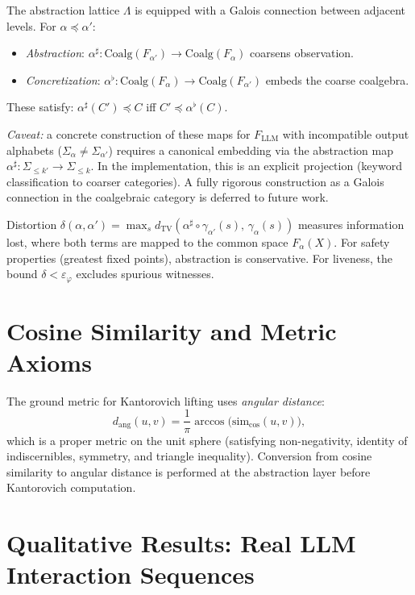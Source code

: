 \documentclass[11pt]{article}
\begin{document}
The abstraction lattice $\Lambda$ is equipped with a Galois connection
between adjacent levels.  For $\alpha \preceq \alpha'$:
\begin{itemize}[nosep,leftmargin=*]
\item \emph{Abstraction}: $\alpha^{\sharp}: \mathrm{Coalg}(F_{\alpha'}) \to
  \mathrm{Coalg}(F_{\alpha})$ coarsens observation.
\item \emph{Concretization}: $\alpha^{\flat}: \mathrm{Coalg}(F_{\alpha}) \to
  \mathrm{Coalg}(F_{\alpha'})$ embeds the coarse coalgebra.
\end{itemize}
These satisfy: $\alpha^{\sharp}(C') \preceq C$ iff
$C' \preceq \alpha^{\flat}(C)$.

\emph{Caveat:} a concrete construction of these maps for
$F_{\mathrm{LLM}}$ with incompatible output alphabets
($\Sigma_\alpha \neq \Sigma_{\alpha'}$) requires a canonical
embedding via the abstraction map $\alpha^\sharp: \Sigma_{\le k'}
\to \Sigma_{\le k}$.  In the implementation, this is an explicit
projection (keyword classification to coarser categories).  A
fully rigorous construction as a Galois connection in the coalgebraic
category is deferred to future work.

Distortion $\delta(\alpha, \alpha') = \max_s
d_{\mathrm{TV}}(\alpha^\sharp \circ \gamma_{\alpha'}(s),\,
\gamma_\alpha(s))$ measures information lost, where both terms
are mapped to the common space $F_\alpha(X)$.
For safety properties (greatest fixed points),
abstraction is conservative.  For liveness, the bound
$\delta < \varepsilon_\varphi$ excludes spurious witnesses.

\section{Cosine Similarity and Metric Axioms}\label{app:cosine}

The ground metric for Kantorovich lifting uses \emph{angular distance}:
\[
  d_{\mathrm{ang}}(u, v) = \frac{1}{\pi}\arccos\!\bigl(
    \mathrm{sim}_{\cos}(u, v)\bigr),
\]
which is a proper metric on the unit sphere (satisfying
non-negativity, identity of indiscernibles, symmetry, and triangle
inequality).  Conversion from cosine similarity to angular distance
is performed at the abstraction layer before Kantorovich computation.

\section{Qualitative Results: Real LLM Interaction Sequences}\label{app:interaction}
\end{document}
